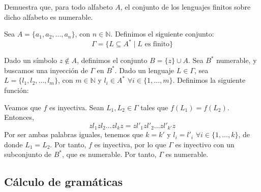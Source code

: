 \begin{ejercicio}
    Demuestra que, para todo alfabeto $A$, el conjunto de los lenguajes finitos sobre dicho alfabeto es numerable.

    Sea $A=\{a_1, a_2, \ldots, a_n\}$, con $n\in \mathbb{N}$. Definimos el siguiente conjunto:
    \begin{equation*}
        \Gamma = \{L\subseteq A^{\ast} \mid L \text{\ es finito}\}
    \end{equation*}

    Dado un símbolo $z\notin A$, definimos el conjunto $B=\{z\}\cup A$. Sea $B^{\ast}$ numerable, y buscamos una inyección de $\Gamma$ en $B^{\ast}$.
    Dado un lenguaje $L\in \Gamma$, sea $L=\{l_1, l_2, \ldots, l_m\}$, con $m\in \mathbb{N}$ y $l_i\in A^{\ast}$ $\forall i\in \{1, \ldots, m\}$. Definimos la siguiente función:

    Veamos que $f$ es inyectiva. Sean $L_1, L_2\in \Gamma$ tales que $f(L_1)=f(L_2)$. Entonces,
    \begin{equation*}
        zl_1zl_2\ldots zl_kz = zl'_1zl'_2\ldots zl'_{k'}z
    \end{equation*}
    Por ser ambas palabras iguales, tenemos que $k=k'$ y $l_i=l'_i$ $\forall i\in \{1, \ldots, k\}$, de donde $L_1=L_2$. Por tanto, $f$ es inyectiva, por lo que $\Gamma$ es inyectivo con un subconjunto de $B^{\ast}$, que es numerable. Por tanto, $\Gamma$ es numerable.
\end{ejercicio}




\subsection{Cálculo de gramáticas}

